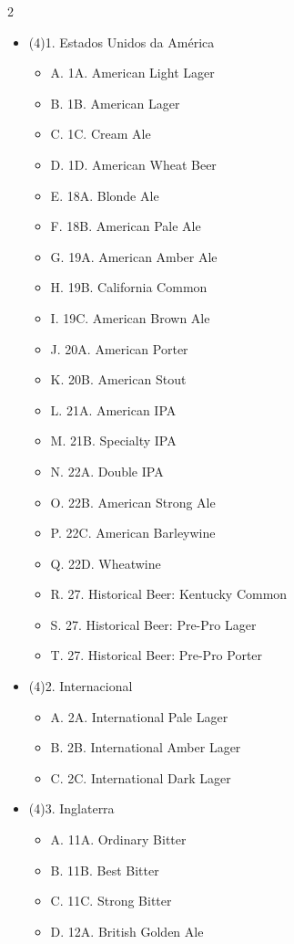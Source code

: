 \begin{multicols*}{2}
\begin{itemize}[noitemsep]
\item[] (4)1. Estados Unidos da América
\begin{itemize}
  \item[] A. 1A. American Light Lager
  \item[] B. 1B. American Lager
  \item[] C. 1C. Cream Ale
  \item[] D. 1D. American Wheat Beer
  \item[] E. 18A. Blonde Ale
  \item[] F. 18B. American Pale Ale
  \item[] G. 19A. American Amber Ale
  \item[] H. 19B. California Common
  \item[] I. 19C. American Brown Ale
  \item[] J. 20A. American Porter
  \item[] K. 20B. American Stout
  \item[] L. 21A. American IPA
  \item[] M. 21B. Specialty IPA
  \item[] N. 22A. Double IPA
  \item[] O. 22B. American Strong Ale
  \item[] P. 22C. American Barleywine
  \item[] Q. 22D. Wheatwine
  \item[] R. 27. Historical Beer: Kentucky Common
  \item[] S. 27. Historical Beer: Pre-Pro Lager
  \item[] T. 27. Historical Beer: Pre-Pro Porter
\end{itemize}
\item[] (4)2. Internacional
\begin{itemize}
  \item[] A. 2A. International Pale Lager
  \item[] B. 2B. International Amber Lager
  \item[] C. 2C. International Dark Lager
\end{itemize}
\item[] (4)3. Inglaterra
\begin{itemize}
  \item[] A. 11A. Ordinary Bitter
  \item[] B. 11B. Best Bitter
  \item[] C. 11C. Strong Bitter
  \item[] D. 12A. British Golden Ale

\end{itemize}
\end{itemize}
\end{multicols*}
